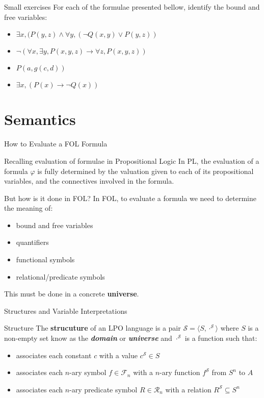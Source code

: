 \documentclass[aspectratio=169]{beamer}
\begin{document}
\begin{slide}{Small exercises}
For each of the formulae presented bellow, identify the bound and free variables:
\begin{itemize}
\item $\exists x, (P(y,z) \land \forall y, (\neg Q(x,y) \lor P(y,z))$  
\item $\neg(\forall x, \exists y, P(x,y,z) \to \forall z, P(x,y,z))$
\item $P(a,g(c,d))$
\item $\exists x, (P(x) \to \neg Q(x))$
\end{itemize}
\end{slide}

\section*{Semantics}

\begin{slide}{How to Evaluate a FOL Formula}
  \begin{block}{Recalling evaluation of formulae in Propositional Logic}
  In PL, the evaluation of a formula $\varphi$ is fully determined by the valuation given to each of its propositional variables, and the connectives involved in the formula.  
  \end{block}
  
  \begin{block}{But how is it done in FOL?}
  In FOL, to evaluate a formula we need to determine the meaning of:
    \begin{itemize}
    \item bound and free variables
    \item quantifiers
    \item functional symbols
    \item relational/predicate symbols
    \end{itemize}
    This must be done in a concrete {\bf universe}.
  \end{block}
\end{slide}

\begin{slide}{Structures and Variable Interpretations}

\begin{block}{Structure}
The {\bf strucuture} of an LPO language is a pair $\mathcal{S} = \langle S, \cdot^\mathcal{S} \rangle$ where $S$ is a non-empty set know as the \textbf{\textit{domain}} or \textbf{\textit{universe}} and $\cdot^\mathcal{S}$ is a function such that:
\begin{itemize}
  \item associates each constant $c$ with a value $c^\mathcal{S} \in S$
  \item associates each $n$-ary symbol $f \in \mathcal{F}_n$ with a $n$-ary function $f^\mathcal{S}$ from $S^n$ to $A$
  \item associates each $n$-ary predicate symbol $R \in \mathcal{R}_n$ with a relation $R^\mathcal{S} \subseteq S^n$
\end{itemize}
\end{block}
\end{slide}
\end{document}
